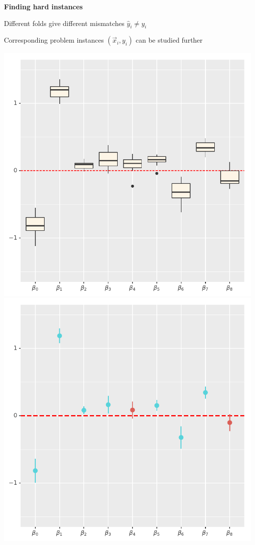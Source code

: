 \documentclass[landscape,footrule]{foils}
\begin{document}
\textbf{Finding hard instances}
\begin{triangles}
\item Different folds give different mismatches $\hat{y}_i\neq y_i$
\item Corresponding problem instances $(\vec{x}_i, y_i)$ can be studied further
\end{triangles}



\centerline{
\includegraphics[scale=0.8]{crossvalidation_parameter_variance_i}\hspace*{0.5cm}
\includegraphics[scale=0.8]{crossvalidation_parameter_variance_ii}}
\end{document}
